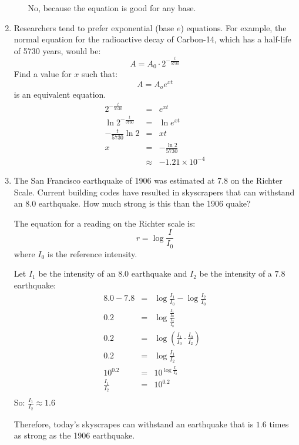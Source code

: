 \documentclass[letterpaper,12pt,fleqn]{article}
\begin{document}
\begin{enumerate}
\begin{enumerate}
No, because the equation is good for any base.
\end{enumerate} 

\item Researchers tend to prefer exponential (base $e$) equations. For example,
the normal equation for the radioactive decay of Carbon-14, which has a
half-life of 5730 years, would be:
\[A=A_0\cdot2^{-\frac{t}{5730}}\]
Find a value for $x$ such that:
\[A=A_oe^{xt}\]
is an equivalent equation.
\begin{eqnarray*}
  2^{-\frac{t}{5730}} &=& e^{xt} \\
  \ln2^{-\frac{t}{5730}} &=& \ln e^{xt} \\
  -\frac{t}{5730}\ln2 &=& xt \\
  x &=& -\frac{\ln2}{5730} \\
  &\approx& -1.21\times10^{-4}
\end{eqnarray*}

\item The San Francisco earthquake of 1906 was estimated at 7.8 on the Richter
Scale. Current building codes have resulted in skyscrapers that can withstand
an 8.0 earthquake. How much strong is this than the 1906 quake?

The equation for a reading on the Richter scale is:
\[r=\log\frac{I}{I_0}\]
where $I_0$ is the reference intensity.

Let $I_1$ be the intensity of an $8.0$ earthquake and $I_2$ be the intensity of
a $7.8$ earthquake:
\begin{eqnarray*}
  8.0-7.8 &=& \log\frac{I_1}{I_0}-\log\frac{I_2}{I_0} \\
  0.2 &=& \log\frac{\frac{I_1}{I_0}}{\frac{I_2}{I_0}} \\
  0.2 &=& \log\left(\frac{I_1}{I_0}\cdot\frac{I_0}{I_2}\right) \\
  0.2 &=& \log\frac{I_1}{I_2} \\
  10^{0.2} &=& 10^{\log\frac{I_1}{I_2}} \\
  \frac{I_1}{I_2} &=& 10^{0.2} \\
\end{eqnarray*}
So: $\frac{I_1}{I_2}\approx1.6$

Therefore, today's skyscrapes can withstand an earthquake that is $1.6$ times
as strong as the 1906 earthquake.

\end{enumerate}
 
\end{document}
